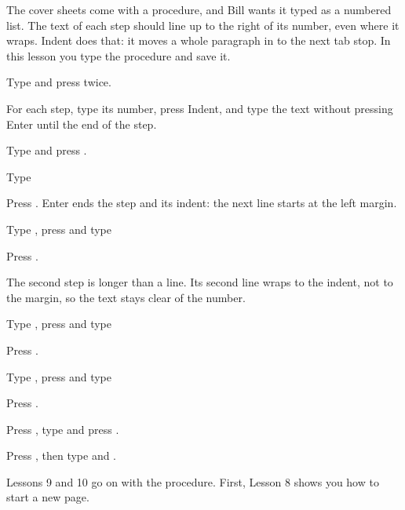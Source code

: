 The cover sheets come with a procedure, and Bill wants it typed as a
numbered list.  The text of each step should line up to the right of its
number, even where it wraps.  Indent does that: it moves a whole paragraph
in to the next tab stop.  In this lesson you type the procedure and save it.

\begin{WPSteps}
\item Type  and press 
twice.
\end{WPSteps}

For each step, type its number, press Indent, and type the text without
pressing Enter until the end of the step.
\begin{WPSteps}
\item Type  and press .
\item Type
\item Press .  Enter ends the step and its indent: the next
line starts at the left margin.
\item Type , press  and type
\item Press .
\end{WPSteps}
The second step is longer than a line.  Its second line wraps to the indent,
not to the margin, so the text stays clear of the number.
\begin{WPSteps}[resume]
\item Type , press  and type
\item Press .
\item Type , press  and type
\item Press .
\end{WPSteps}

\begin{WPSteps}[resume]
\item Press , type  and press
.
\item Press , then type  and .
\end{WPSteps}
\EndReplay
Lessons 9 and 10 go on with the procedure.  First, Lesson 8 shows you how
to start a new page.

